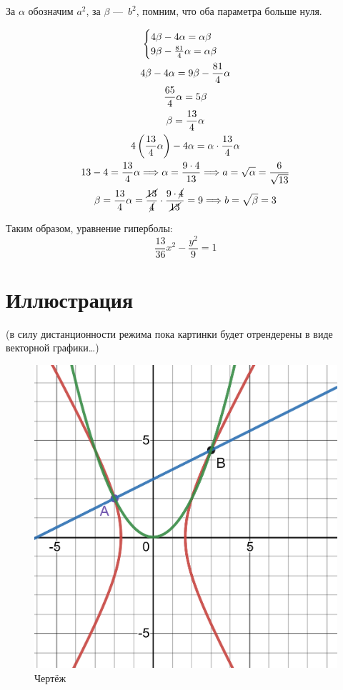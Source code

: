 \documentclass[12pt, a4paper]{article}
\begin{document}
    За $\alpha$ обозначим $a^2$, за $\beta$ — $b^2$, помним, что оба параметра больше нуля.

    \begin{gather}
        \begin{cases}
            4\beta - 4\alpha = \alpha\beta \\
            9\beta - \frac{81}{4} \alpha = \alpha\beta
        \end{cases} \\
        4\beta - 4\alpha = 9\beta - \frac{81}{4} \alpha \\
        \frac{65}{4}\alpha = 5\beta \\
        \beta = \frac{13}{4}\alpha \\
        4 \left( \frac{13}{4}\alpha \right) - 4\alpha = \alpha \cdot \frac{13}{4}\alpha \\
        13 - 4 = \frac{13}{4}\alpha \Longrightarrow \alpha = \frac{9 \cdot 4}{13} \Longrightarrow a = \sqrt{\alpha} = \frac{6}{\sqrt{13}} \\
        \beta = \frac{13}{4}\alpha = \frac{\cancel{13}}{\cancel{4}} \cdot \frac{9 \cdot \cancel{4}}{\cancel{13}} = 9 \Longrightarrow b = \sqrt{\beta} = 3
    \end{gather}

    Таким образом, уравнение гиперболы:
    \begin{equation}
        \frac{13}{36} x^2 - \frac{y^2}{9} = 1
    \end{equation}


    \section{Иллюстрация}

    (в силу дистанционности режима пока картинки будет отрендерены в виде векторной графики…)

    \begin{figure}[h!]
        \centering
        \includegraphics[width=\textwidth]{resources/1.6_figure.pdf}
        \caption{Чертёж}
        \label{fig:main_figure}
    \end{figure}
    \FloatBarrier
\end{document}
